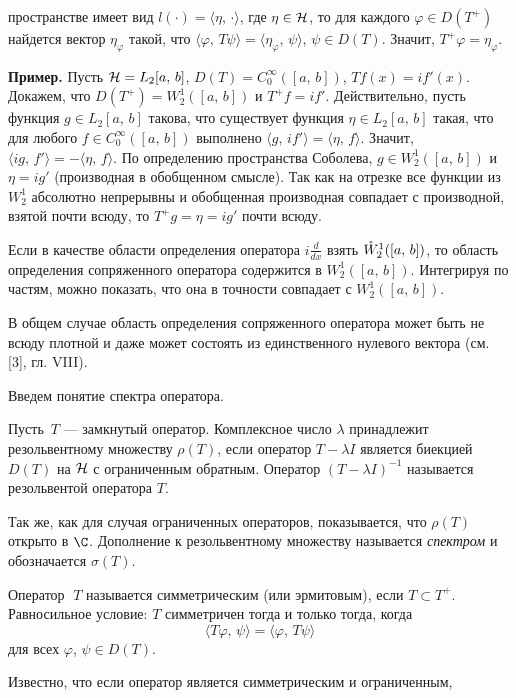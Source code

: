 \documentclass[a4paper
]{article}
\begin{document}
пространстве имеет вид $l(\cdot)=\langle\eta, \, \cdot\rangle$,
где $\eta\in {\cal H}$, то для каждого $\varphi\in D(T^+)$ найдется
вектор $\eta_\varphi$ такой, что $\langle \varphi, \, T\psi\rangle=
\langle \eta_\varphi, \, \psi\rangle$, $\psi\in D(T)$. Значит,
$T^+\varphi=\eta_\varphi$. \par
{\bf Пример.} Пусть ${\cal H}=L_2[a, \, b]$, $D(T)=C_0^\infty([a, \, b])$,
$Tf(x)=if'(x)$. Докажем, что $D(T^+)=W^1_2([a, \, b])$ и $T^+f=if'$.
Действительно, пусть функция $g\in L_2[a, \, b]$ такова, что существует
функция $\eta\in L_2[a, \, b]$ такая, что для любого $f\in C_0^\infty([a, \, b])$
выполнено $\langle g, \, if'\rangle=\langle \eta, \, f\rangle$. Значит,
$\langle ig, \, f'\rangle=-\langle \eta, \, f\rangle$. По определению
пространства Соболева, $g\in W^1_2([a, \, b])$ и $\eta=ig'$ (производная
в обобщенном смысле). Так как на отрезке все функции из $W^1_2$
абсолютно непрерывны и обобщенная производная совпадает с производной,
взятой почти всюду, то $T^+g=\eta=ig'$ почти всюду. \par
Если в качестве области определения оператора $i\frac{d}{dx}$ взять
$\mathaccent'27 W^1_2([a, \, b])$, то область определения сопряженного
оператора содержится в $W^1_2([a, \, b])$. Интегрируя по частям,
можно показать, что она в точности совпадает с $W^1_2([a, \, b])$. \par
В общем случае область определения сопряженного оператора может быть не
всюду плотной и даже может состоять из единственного нулевого вектора
(см. [3], гл. VIII). \par
Введем понятие спектра оператора.
\begin{Def}
Пусть $\, T$ --- замкнутый оператор. Комплексное число $\lambda$
принадлежит резольвентному множеству $\rho(T)$, если оператор
$T-\lambda I$ является биекцией $D(T)$ на ${\cal H}$ с ограниченным
обратным. Оператор $(T-\lambda I)^{-1}$ называется резольвентой оператора $T$.
\end{Def}
Так же, как для случая ограниченных операторов, показывается, что
$\rho(T)$ открыто в $\C$. Дополнение к резольвентному множеству
называется {\it спектром} и обозначается $\sigma(T)$.
\begin{Def}
Оператор $\; T$ называется симметрическим (или эрмитовым), если
$T\subset T^+$. Равносильное условие: $T$ симметричен тогда и
только тогда, когда $$\langle T\varphi, \, \psi\rangle=\langle\varphi, \,
T\psi\rangle$$ для всех $\varphi$, $\psi\in D(T)$.
\end{Def}
Известно, что если оператор является симметрическим и ограниченным,
\end{document}
